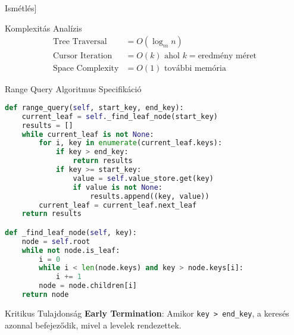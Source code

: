 \documentclass[aspectratio=169]{beamer}
\begin{document}
\begin{frame}[fragile]{Ismétlés}]
\begin{center}
\end{center}

\begin{block}{Komplexitás Analízis}
\begin{align}
\text{Tree Traversal} &= O(\log_m n) \\
\text{Cursor Iteration} &= O(k) \text{ ahol } k = \text{eredmény méret} \\
\text{Space Complexity} &= O(1) \text{ további memória}
\end{align}
\end{block}
\end{frame}

\begin{frame}[fragile]{Range Query Algoritmus Specifikáció}
\begin{lstlisting}[language=Python]
def range_query(self, start_key, end_key):
    current_leaf = self._find_leaf_node(start_key)
    results = []
    while current_leaf is not None:
        for i, key in enumerate(current_leaf.keys):
            if key > end_key:
                return results
            if key >= start_key:
                value = self.value_store.get(key)
                if value is not None:
                    results.append((key, value))
        current_leaf = current_leaf.next_leaf
    return results

def _find_leaf_node(self, key):
    node = self.root
    while not node.is_leaf:
        i = 0
        while i < len(node.keys) and key > node.keys[i]:
            i += 1
        node = node.children[i]
    return node
\end{lstlisting}

\begin{alertblock}{Kritikus Tulajdonság}
\textbf{Early Termination}: Amikor \texttt{key > end\_key}, a keresés azonnal befejeződik, mivel a levelek rendezettek.
\end{alertblock}
\end{frame}
\end{document}

